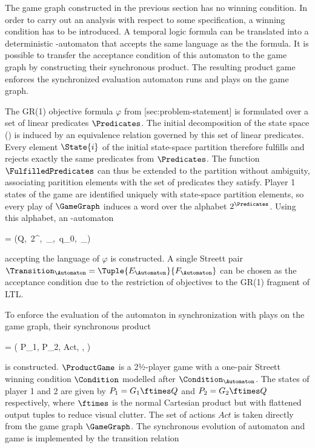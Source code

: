 The game graph constructed in the previous section has no winning condition.
In order to carry out an analysis with respect to some specification, a winning condition has to be introduced.
A temporal logic formula can be translated into a deterministic \omega-automaton that accepts the same language as the the formula.
It is possible to transfer the acceptance condition of this automaton to the game graph by constructing their synchronous product.
The resulting product game enforces the synchronized evaluation automaton runs and plays on the game graph.


\startsubsection[title={Objective Automaton},reference=sec:abstraction-product-automaton]

    The GR(1) objective formula $\varphi$ from [sec:problem-statement] is formulated over a set of linear predicates $\Predicates$.
    The initial decomposition of the state space () is induced by an equivalence relation governed by this set of linear predicates.
    Every element $\State{i}$ of the initial state-space partition therefore fulfills and rejects exactly the same predicates from $\Predicates$.
    The function $\FulfilledPredicates$ can thus be extended to the partition without ambiguity, associating paritition elements with the set of predicates they satisfy.
    Player 1 states of the game are identified uniquely with state-space partition elements, so every play of $\GameGraph$ induces a word over the alphabet $2^\Predicates$.
    Using this alphabet, an \omega-automaton

    \startformula
        \Automaton = (Q,\, 2^\Predicates,\, \Transition_\Automaton,\, q_0,\, \Condition_\Automaton)
    \stopformula

    accepting the language of $\varphi$ is constructed.
    A single Streett pair $\Transition_\Automaton = \Tuple{E_\Automaton}{F_\Automaton}$ can be chosen as the acceptance condition due to the restriction of objectives to the GR(1) fragment of LTL.

\stopsubsection


\startsubsection[title={Synchronized Product},reference=sec:abstraction-product-product]

    To enforce the evaluation of the automaton in synchronization with plays on the game graph, their synchronous product

    \startformula
        \ProductGame = ( P_1, P_2, Act, \Transition, \Condition )
    \stopformula

    is constructed.
    $\ProductGame$ is a 2½-player game with a one-pair Streett winning condition $\Condition$ modelled after $\Condition_\Automaton$.
    The states of player 1 and 2 are given by $P_1 = G_1 \ftimes Q$ and $P_2 = G_2 \ftimes Q$ respectively, where $\ftimes$ is the normal Cartesian product but with flattened output tuples to reduce visual clutter.
    The set of actions $Act$ is taken directly from the game graph $\GameGraph$.
    The synchronous evolution of automaton and game is implemented by the transition relation

